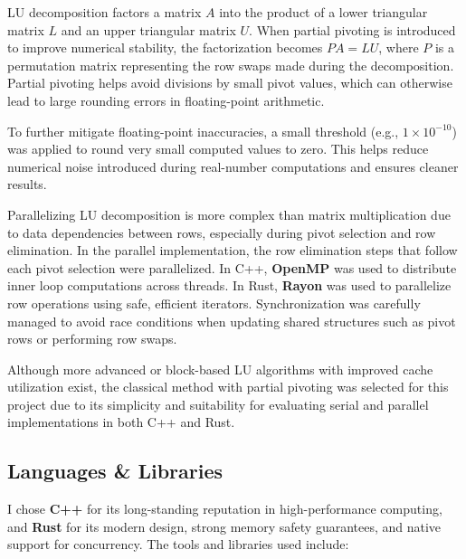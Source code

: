 \documentclass[12pt]{article}
\begin{document}
LU decomposition factors a matrix \( A \) into the product of a lower triangular matrix \( L \) and an upper triangular matrix \( U \). When partial
pivoting is introduced to improve numerical stability, the factorization becomes \( PA = LU \), where \( P \) is a permutation matrix representing the
row swaps made during the decomposition. Partial pivoting helps avoid divisions by small pivot values, which can otherwise lead to large rounding errors
in floating-point arithmetic.

To further mitigate floating-point inaccuracies, a small threshold (e.g., \(1 \times 10^{-10}\)) was applied to round very small computed values to zero.
This helps reduce numerical noise introduced during real-number computations and ensures cleaner results.

Parallelizing LU decomposition is more complex than matrix multiplication due to data dependencies between rows, especially during pivot selection and row
elimination. In the parallel implementation, the row elimination steps that follow each pivot selection were parallelized. In C++, \textbf{OpenMP} was used
to distribute inner loop computations across threads. In Rust, \textbf{Rayon} was used to parallelize row operations using safe, efficient iterators.
Synchronization was carefully managed to avoid race conditions when updating shared structures such as pivot rows or performing row swaps.

Although more advanced or block-based LU algorithms with improved cache utilization exist, the classical method with partial pivoting was selected for this
project due to its simplicity and suitability for evaluating serial and parallel implementations in both C++ and Rust.


\subsection*{Languages \& Libraries}

I chose \textbf{C++} for its long-standing reputation in high-performance computing, and \textbf{Rust} for its modern design, strong memory safety guarantees,
and native support for concurrency. The tools and libraries used include:
\end{document}
